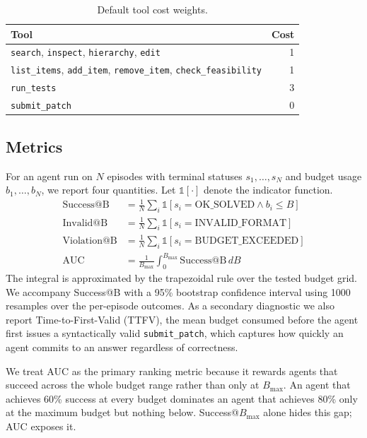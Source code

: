 \documentclass[11pt]{article}
\begin{document}
\begin{table}[t]
  \centering
  \caption{Default tool cost weights.}
  \label{tab:cost}
  \begin{tabular}{lr}
    \toprule
    Tool & Cost \\
    \midrule
    \texttt{search}, \texttt{inspect}, \texttt{hierarchy}, \texttt{edit} & 1 \\
    \texttt{list\_items}, \texttt{add\_item}, \texttt{remove\_item}, \texttt{check\_feasibility} & 1 \\
    \texttt{run\_tests} & 3 \\
    \texttt{submit\_patch} & 0 \\
    \bottomrule
  \end{tabular}
\end{table}

\subsection{Metrics}
\label{sec:framework:metrics}

For an agent run on $N$ episodes with terminal statuses $s_1, \ldots, s_N$
and budget usage $b_1, \ldots, b_N$, we report four quantities. Let
$\mathbb{1}[\cdot]$ denote the indicator function.
\begin{align*}
\text{Success@B}    &= \tfrac{1}{N} \sum_i \mathbb{1}[s_i = \text{OK\_SOLVED} \land b_i \le B] \\
\text{Invalid@B}    &= \tfrac{1}{N} \sum_i \mathbb{1}[s_i = \text{INVALID\_FORMAT}] \\
\text{Violation@B}  &= \tfrac{1}{N} \sum_i \mathbb{1}[s_i = \text{BUDGET\_EXCEEDED}] \\
\text{AUC}          &= \tfrac{1}{B_\text{max}} \int_{0}^{B_\text{max}} \text{Success@B} \, dB
\end{align*}
The integral is approximated by the trapezoidal rule over the tested
budget grid. We accompany Success@B with a 95\% bootstrap confidence
interval using 1000 resamples over the per-episode outcomes. As a
secondary diagnostic we also report Time-to-First-Valid (TTFV), the
mean budget consumed before the agent first issues a syntactically
valid \texttt{submit\_patch}, which captures how quickly an agent
commits to an answer regardless of correctness.

We treat AUC as the primary ranking metric because it rewards agents
that succeed across the whole budget range rather than only at
$B_\text{max}$. An agent that achieves 60\% success at every budget
dominates an agent that achieves 80\% only at the maximum budget but
nothing below. Success@$B_\text{max}$ alone hides this gap; AUC exposes
it.
\end{document}
